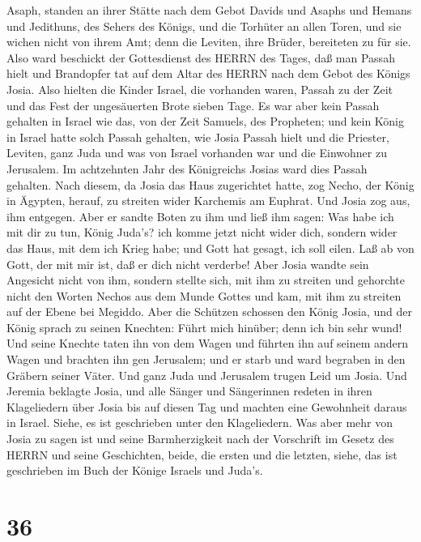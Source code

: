 Asaph, standen an ihrer Stätte nach dem Gebot Davids und Asaphs und
Hemans und Jedithuns, des Sehers des Königs, und die Torhüter an allen
Toren, und sie wichen nicht von ihrem Amt; denn die Leviten, ihre
Brüder, bereiteten zu für sie.  Also ward beschickt der
Gottesdienst des HERRN des Tages, daß man Passah hielt und Brandopfer
tat auf dem Altar des HERRN nach dem Gebot des Königs Josia.
 Also hielten die Kinder Israel, die vorhanden waren,
Passah zu der Zeit und das Fest der ungesäuerten Brote sieben Tage.
 Es war aber kein Passah gehalten in Israel wie das, von
der Zeit Samuels, des Propheten; und kein König in Israel hatte solch
Passah gehalten, wie Josia Passah hielt und die Priester, Leviten, ganz
Juda und was von Israel vorhanden war und die Einwohner zu Jerusalem.
 Im achtzehnten Jahr des Königreichs Josias ward dies
Passah gehalten.  Nach diesem, da Josia das Haus
zugerichtet hatte, zog Necho, der König in Ägypten, herauf, zu streiten
wider Karchemis am Euphrat. Und Josia zog aus, ihm entgegen.
 Aber er sandte Boten zu ihm und ließ ihm sagen: Was habe
ich mit dir zu tun, König Juda's? ich komme jetzt nicht wider dich,
sondern wider das Haus, mit dem ich Krieg habe; und Gott hat gesagt, ich
soll eilen. Laß ab von Gott, der mit mir ist, daß er dich nicht
verderbe!  Aber Josia wandte sein Angesicht nicht von ihm,
sondern stellte sich, mit ihm zu streiten und gehorchte nicht den Worten
Nechos aus dem Munde Gottes und kam, mit ihm zu streiten auf der Ebene
bei Megiddo.  Aber die Schützen schossen den König Josia,
und der König sprach zu seinen Knechten: Führt mich hinüber; denn ich
bin sehr wund!  Und seine Knechte taten ihn von dem Wagen
und führten ihn auf seinem andern Wagen und brachten ihn gen Jerusalem;
und er starb und ward begraben in den Gräbern seiner Väter. Und ganz
Juda und Jerusalem trugen Leid um Josia.  Und Jeremia
beklagte Josia, und alle Sänger und Sängerinnen redeten in ihren
Klageliedern über Josia bis auf diesen Tag und machten eine Gewohnheit
daraus in Israel. Siehe, es ist geschrieben unter den Klageliedern.
 Was aber mehr von Josia zu sagen ist und seine
Barmherzigkeit nach der Vorschrift im Gesetz des HERRN  und
seine Geschichten, beide, die ersten und die letzten, siehe, das ist
geschrieben im Buch der Könige Israels und Juda's.

\hypertarget{section-35}{%
\section{36}\label{section-35}}

